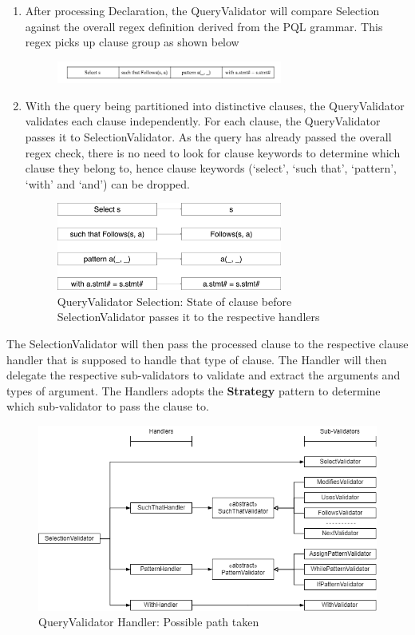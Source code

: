 \documentclass[12pt]{article}
\begin{document}
{{{{{{{{{{{{{\begin{enumerate}
For example, \begin{verbatim}
stmt s; stmt s;
Select s

stmt s, s;
Select s
\end{verbatim}
are considered invalid.
\item After processing Declaration, the QueryValidator will compare Selection against the overall regex definition derived from the PQL grammar. This regex picks up clause group as shown below
\begin{figure}[H]
  \centering 
 \includegraphics[width=0.7\textwidth]{Step3.png}
\end{figure}
\item With the query being partitioned into distinctive clauses, the QueryValidator validates each clause independently. For each clause, the QueryValidator passes it to SelectionValidator. As the query has already passed the overall regex check, there is no need to look for clause keywords to determine which clause they belong to, hence clause keywords (‘select’, ‘such that’, ‘pattern’, ‘with’ and ‘and’) can be dropped.
\begin{figure}[H]
  \centering 
  \caption{QueryValidator Selection: State of clause before SelectionValidator passes it to the respective handlers}
 \includegraphics[width=0.7\textwidth]{QvSelection.png}
\end{figure}
\end{enumerate}
The SelectionValidator will then pass the processed clause to the respective clause handler that is supposed to handle that type of clause. The Handler will then delegate the respective sub-validators to validate and extract the arguments and types of argument. The Handlers adopts the \textbf{Strategy} pattern to determine which sub-validator to pass the clause to.
\begin{figure}[H]
  \centering 
  \caption{QueryValidator Handler: Possible path taken}
 \includegraphics[width=1.0\textwidth]{QVHandler.png}

\end{figure}}}}}}}}}}}}}}
\end{document}
